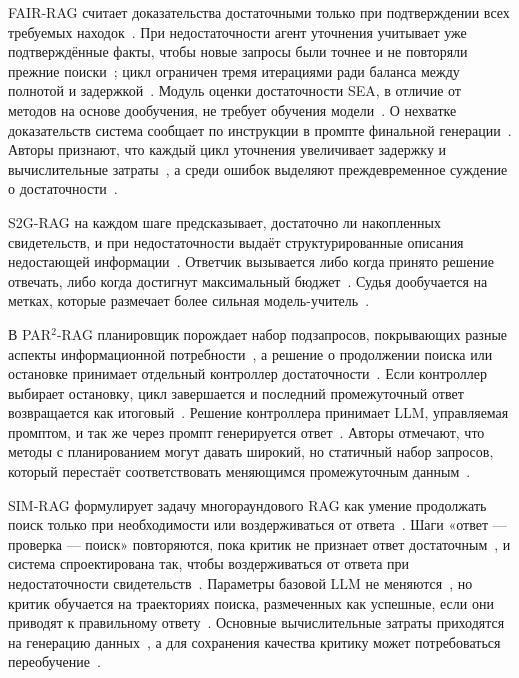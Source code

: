 \documentclass{misisarticle}
\begin{document}
FAIR-RAG считает доказательства достаточными только при подтверждении всех требуемых находок~\cite{asl2025fairrag}. %
При недостаточности агент уточнения учитывает уже подтверждённые факты, чтобы новые запросы были точнее и не повторяли прежние поиски~\cite{asl2025fairrag}; %
цикл ограничен тремя итерациями ради баланса между полнотой и задержкой~\cite{asl2025fairrag}. %
Модуль оценки достаточности SEA, в отличие от методов на основе дообучения, не требует обучения модели~\cite{asl2025fairrag}. %
О нехватке доказательств система сообщает по инструкции в промпте финальной генерации~\cite{asl2025fairrag}. %
Авторы признают, что каждый цикл уточнения увеличивает задержку и вычислительные затраты~\cite{asl2025fairrag}, %
а среди ошибок выделяют преждевременное суждение о достаточности~\cite{asl2025fairrag}. %

S2G-RAG на каждом шаге предсказывает, достаточно ли накопленных свидетельств, и при недостаточности выдаёт структурированные описания недостающей информации~\cite{li2026s2grag}. %
Ответчик вызывается либо когда принято решение отвечать, либо когда достигнут максимальный бюджет~\cite{li2026s2grag}. %
Судья дообучается на метках, которые размечает более сильная модель-учитель~\cite{li2026s2grag}. %

В PAR$^2$-RAG планировщик порождает набор подзапросов, покрывающих разные аспекты информационной потребности~\cite{li2026par2}, %
а решение о продолжении поиска или остановке принимает отдельный контроллер достаточности~\cite{li2026par2}. %
Если контроллер выбирает остановку, цикл завершается и последний промежуточный ответ возвращается как итоговый~\cite{li2026par2}. %
Решение контроллера принимает LLM, управляемая промптом, и так же через промпт генерируется ответ~\cite{li2026par2}. %
Авторы отмечают, что методы с планированием могут давать широкий, но статичный набор запросов, который перестаёт соответствовать меняющимся промежуточным данным~\cite{li2026par2}. %

SIM-RAG формулирует задачу многораундового RAG как умение продолжать поиск только при необходимости или воздерживаться от ответа~\cite{yang2025knowing}. %
Шаги «ответ --- проверка --- поиск» повторяются, пока критик не признает ответ достаточным~\cite{yang2025knowing}, %
и система спроектирована так, чтобы воздерживаться от ответа при недостаточности свидетельств~\cite{yang2025knowing}. %
Параметры базовой LLM не меняются~\cite{yang2025knowing}, %
но критик обучается на траекториях поиска, размеченных как успешные, если они приводят к правильному ответу~\cite{yang2025knowing}. %
Основные вычислительные затраты приходятся на генерацию данных~\cite{yang2025knowing}, %
а для сохранения качества критику может потребоваться переобучение~\cite{yang2025knowing}. %
\end{document}
